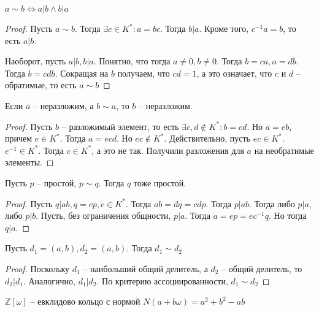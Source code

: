 \documentclass{article}
\begin{document}
\begin{statement}
    $a \sim b \Leftrightarrow a | b \wedge b | a$
\end{statement}

\begin{proof}
    Пусть $a \sim b$. Тогда $\exists c \in K^*: a = bc$. Тогда $b | a$. Кроме того, $c^{-1}a = b$, то есть $a | b$.

    Наоборот, пусть $a | b, b | a$. Понятно, что тогда $a \neq 0, b \neq 0$. Тогда $b = ca, a = db$. Тогда $b = cdb$.
    Сокращая на $b$ получаем, что $cd = 1$, а это означает, что $c$ и $d$ -- обратимые, то есть $a \sim b$
\end{proof}

\begin{statement}
    Если $a$ -- неразложим, а $b \sim a$, то $b$ -- неразложим.
\end{statement}

\begin{proof}
    Пусть $b$ -- разложимый элемент, то есть $\exists c, d \not \in K^*: b = cd$. Но $a = eb$, причем $e \in K^*$. Тогда
    $a = ecd$. Но $ec \not \in K^*$. Действительно, пусть $ec \in K^*$. $e^{-1} \in K^*$. Тогда $c \in K^*$, а это не
    так. Получили разложения для $a$ на необратимые элементы.
\end{proof}

\begin{statement}
    Пусть $p$ -- простой, $p \sim q$. Тогда $q$ тоже простой.
\end{statement}

\begin{proof}
    Пусть $q | ab, q = cp, c \in K^*$. Тогда $ab = dq = cdp$. Тогда $p | ab$. Тогда либо $p | a$, либо $p | b$. Пусть,
    без ограничения общности, $p | a$. Тогда $a = ep = e c^{-1}q$. Но тогда $q | a$.
\end{proof}

\begin{statement}
    Пусть $d_1 = (a, b), d_2 = (a, b)$. Тогда $d_1 \sim d_2$
\end{statement}

\begin{proof}
    Поскольку $d_1$ -- наибольший общий делитель, а $d_2$ -- общий делитель, то $d_2 | d_1$. Аналогично, $d_1 | d_2$. По
    критерию ассоциированности, $d_1 \sim d_2$
\end{proof}

\begin{statement}
    \label{zw_euclidean}
    $\mathbb{Z}[\omega]$ -- евклидово кольцо с нормой $N(a + b \omega) = a^2 + b^2 - ab$
\end{statement}
\end{document}
